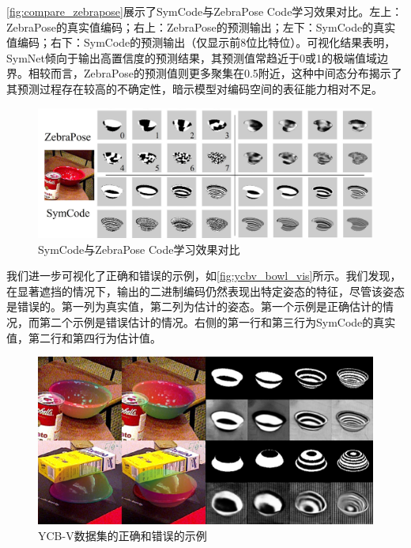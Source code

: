 \autoref{fig:compare_zebrapose}展示了SymCode与ZebraPose Code学习效果对比。左上：ZebraPose的真实值编码；右上：ZebraPose的预测输出；左下：SymCode的真实值编码；右下：SymCode的预测输出（仅显示前8位比特位）。可视化结果表明，SymNet倾向于输出高置信度的预测结果，其预测值常趋近于0或1的极端值域边界。相较而言，ZebraPose的预测值则更多聚集在0.5附近，这种中间态分布揭示了其预测过程存在较高的不确定性，暗示模型对编码空间的表征能力相对不足。

\begin{figure}[htbp]
        \centerline{\includegraphics[width=1.0\textwidth]{figure/symnet/compare_with_zebrapose.jpg}}
        \caption{SymCode与ZebraPose Code学习效果对比}
        \label{fig:compare_zebrapose}
\end{figure}

我们进一步可视化了正确和错误的示例，如\autoref{fig:ycbv_bowl_vis}所示。我们发现，在显著遮挡的情况下，输出的二进制编码仍然表现出特定姿态的特征，尽管该姿态是错误的。第一列为真实值，第二列为估计的姿态。第一个示例是正确估计的情况，而第二个示例是错误估计的情况。右侧的第一行和第三行为SymCode的真实值，第二行和第四行为估计值。

\begin{figure}[ht]
        \centerline{\includegraphics[width=1.0\textwidth]{figure/symnet/ycbv_bowl_vis.jpg}}
        \caption{YCB-V数据集的正确和错误的示例}
        \label{fig:ycbv_bowl_vis}
\end{figure}


